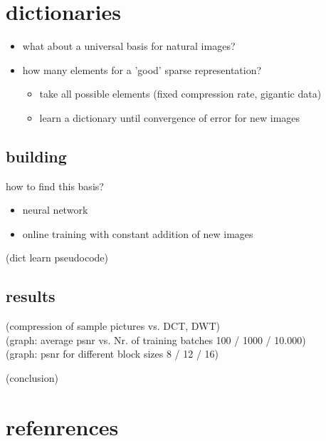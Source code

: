 \section{dictionaries}
\begin{frame}
\begin{itemize}
\item what about a universal basis for natural images? 
\pause
\item how many elements for a 'good' sparse representation?
\pause
	\begin{itemize}
	\item take all possible elements (fixed compression rate, gigantic data)
	\pause
	\item learn a dictionary until convergence of error for new images
	\end{itemize}
\end{itemize}
\end{frame}

\subsection{building}
\begin{frame}
how to find this basis? 
\pause
\begin{itemize}
\item neural network \cite{Krizhevsky2009Learning}
\item online training with constant addition of new images \cite{Mairal2010Online}
\end{itemize}
\end{frame}

\begin{frame}
(dict learn pseudocode)
\end{frame}


\subsection{results}
\begin{frame}
(compression of sample pictures vs. DCT, DWT) \\
(graph: average psnr vs. Nr. of training batches 100 / 1000 / 10.000) \\
(graph: psnr for different block sizes 8 / 12  / 16) \\
\end{frame}

\begin{frame}
(conclusion)

\end{frame}


\section{refenrences}



